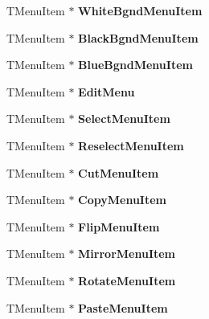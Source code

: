 \begin{DoxyCompactItemize}
T\+Menu\+Item $\ast$ {\bfseries White\+Bgnd\+Menu\+Item}
\item 
\mbox{\label{class_t_interface_acafc632e158877bf086133e52fc784d2}} 
T\+Menu\+Item $\ast$ {\bfseries Black\+Bgnd\+Menu\+Item}
\item 
\mbox{\label{class_t_interface_a74349e233e71e06cae657e98fefa098c}} 
T\+Menu\+Item $\ast$ {\bfseries Blue\+Bgnd\+Menu\+Item}
\item 
\mbox{\label{class_t_interface_a00a0ac1771bafebcb60465ae2906e268}} 
T\+Menu\+Item $\ast$ {\bfseries Edit\+Menu}
\item 
\mbox{\label{class_t_interface_a5104175832dc24c5612088b997ec33a0}} 
T\+Menu\+Item $\ast$ {\bfseries Select\+Menu\+Item}
\item 
\mbox{\label{class_t_interface_a2921e637b86b676bb479862eff975077}} 
T\+Menu\+Item $\ast$ {\bfseries Reselect\+Menu\+Item}
\item 
\mbox{\label{class_t_interface_ab94f4eac102d12975501ffd0f236e8f4}} 
T\+Menu\+Item $\ast$ {\bfseries Cut\+Menu\+Item}
\item 
\mbox{\label{class_t_interface_ae714ce08c9c73f5de0bfd5bf229f80ed}} 
T\+Menu\+Item $\ast$ {\bfseries Copy\+Menu\+Item}
\item 
\mbox{\label{class_t_interface_add6aa7a490de7b80bd9da90266bdbe1c}} 
T\+Menu\+Item $\ast$ {\bfseries Flip\+Menu\+Item}
\item 
\mbox{\label{class_t_interface_a2ab7304ec2fbc435f26d6ad802e22d23}} 
T\+Menu\+Item $\ast$ {\bfseries Mirror\+Menu\+Item}
\item 
\mbox{\label{class_t_interface_af30749cc8ec12872ef1d8a0c90d31498}} 
T\+Menu\+Item $\ast$ {\bfseries Rotate\+Menu\+Item}
\item 
\mbox{\label{class_t_interface_a49148e002db900dbbf7341aca95e67b5}} 
T\+Menu\+Item $\ast$ {\bfseries Paste\+Menu\+Item}

\end{DoxyCompactItemize}
